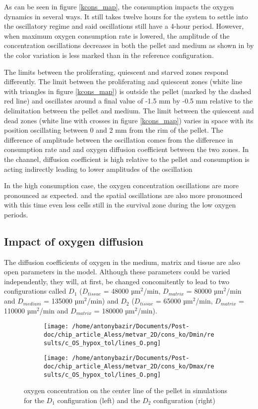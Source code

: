 \documentclass[11pt,a4paper]{article}
\begin{document}
As can be seen in figure \ref{kcons_map}, the consumption impacts the oxygen dynamics in several ways. It still takes twelve hours for the system to settle into the oscillatory regime and said oscillations still have a 4-hour period. However, when maximum oxygen consumption rate is lowered, the amplitude of the concentration oscillations decreases in both the pellet and medium as shown in by the color variation is less marked than in the reference configuration.

The limits between the proliferating, quiescent and starved zones respond differently. The limit between the proliferating and quiescent zones (white line with triangles in figure \ref{kcons_map}) is outside the pellet (marked by the dashed red line) and oscillates around a final value of -1.5 mm by  -0.5 mm relative to the delimitation between the pellet and medium. The limit between the quiescent and dead zones (white line with crosses in figure \ref{kcons_map}) varies in space with its position oscillating between 0 and 2 mm from the rim of the pellet. The difference of amplitude between the oscillation comes from the difference in consumption rate and and oxygen diffusion coefficient between the two zones. In the channel, diffusion coefficient is high relative to the pellet and consumption is acting indirectly leading to lower amplitudes of the oscillation

In the high consumption case, the oxygen concentration oscillations are more pronounced as expected. and the spatial oscillations are also more pronounced  with this time even less cells still in the survival zone during the low oxygen periods.

\subsection{Impact of oxygen diffusion}
The diffusion coefficients of oxygen in the medium, matrix and tissue are also open parameters in the model. Although these parameters could be varied independently, they will, at first, be changed concomitently to lead to two configurations called $D_{1}$ ($D_{tissue}$ = 48000 µm$^2$/min, $D_{matrix}$ = 80000 µm$^2$/min and $D_{medium}$ = 135000 µm$^2$/min) and $D_{2}$ ($D_{tissue}$ = 65000 µm$^2$/min, $D_{matrix}$ = 110000 µm$^2$/min and $D_{matrix}$ = 180000 µm$^2$/min).

\begin{figure}[ht!]
\begin{subfigure}{0.44\textwidth}
	\centering
	\texttt{[image: /home/antonybazir/Documents/Post-doc/chip\_article\_Aless/metvar\_2D/cons\_ko/Dmin/results/c\_OS\_hypox\_tol/lines\_O.png]}
\end{subfigure}
\begin{subfigure}{0.44\textwidth}
	\centering
	\texttt{[image: /home/antonybazir/Documents/Post-doc/chip\_article\_Aless/metvar\_2D/cons\_ko/Dmax/results/c\_OS\_hypox\_tol/lines\_O.png]}
\end{subfigure}
\caption{oxygen concentration on the center line of the pellet in simulations for the $D_{1}$ configuration (left) and the $D_{2}$ configuration (right)  \label{Dminmax_map}}
\end{figure}
\end{document}
